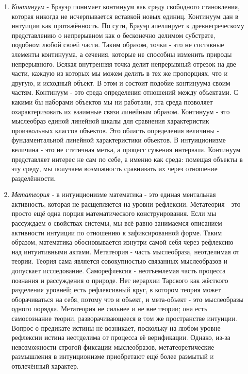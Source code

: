 \documentclass[12pt]{article}
\begin{document}
\begin{enumerate}
    \item {\it Континуум} - Брауэр понимает континуум как среду свободного становления, которая никогда не исчерпывается вставкой новых единиц. Континуум дан в интуиции как протяжённость. По сути, Брауэр апеллирует к древнегреческому представлению о непрерывном как о бесконечно делимом субстрате, подобном любой своей части. Таким образом, точки - это не составные элементы континуума, а сечения, которые не способны изменить природы непрерывного. Всякая внутренняя точка делит непрерывный отрезок на две части, каждую из которых мы можем делить в тех же пропорциях, что и другую, и исходный объект. В этом и состоит подобие континуума своим частям. Континуум - это среда определения отношений между объектами. С какими бы наборами объектов мы ни работали, эта среда позволяет охарактеризовать их взаимные связи линейным образом. Континуум - это мыслеобраз единой линейной шкалы для сравнения характеристик произвольных классов объектов. Это область определения величины - фундаментальной линейной характеристики объектов. В интуиционизме величина - это не статичная метка, а процесс сужения интервала. Континуум представляет интерес не сам по себе, а именно как среда: помещая объекты в эту среду, мы получаем возможность сравнивать их через отношение разделённости.
    \item {\it Метатеория} - в интуиционизме математика - это единая ментальная активность, которая не расщепляется на уровни рефлексии. Метатеория - это просто ещё одна порция математического конструирования. Если мы рассуждаем о свойствах системы, мы всё равно занимаемся описанием активности интуиции по отношению к зафиксированной форме. Таким образом, математика обосновывается изнутри самой себя через рефлексию над интуитивными актами. Метатеория - часть мыслеобраза, неотделимая от теории. Теория сама является совокупностью связанных мыслеобразов и допускает исследование. Саморефлексия - неотъемлемая часть процесса познания и рассуждения о природе. Нет иерархии Тарского как жёсткого разделения уровней; есть рефлексивный круг, в котором теория может оборачиваться на себя, потому что и объект, и мета-объект - это мыслеобразы одного порядка. Метатеория не сильнее и не вне теории; она есть самосознание теории, разворачивающееся в том же пространстве интуиции. Вопрос о предикате истины не возникает, поскольку на любом уровне рефлексии истина неотделима от процесса её верификации. Однако, из-за невозможности строгой фиксации мыслеобразов, метатеоретические размышления в интуиционизме приобретают ещё более размытый и отвлечённый характер.
\end{enumerate}
\end{document}
